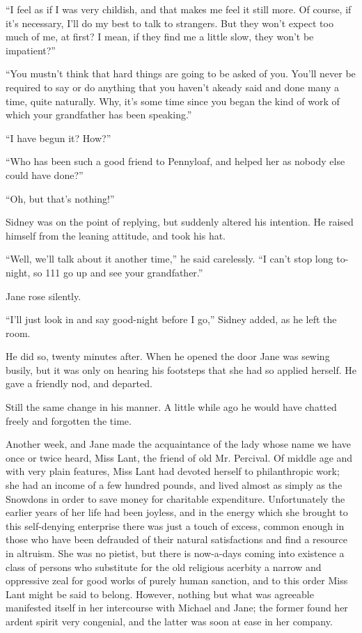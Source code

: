 ``I feel as if I was very childish, and that makes me feel it still
more. Of course, if it's necessary, I'll do my best to talk to
strangers. {}But they won't expect too much of me, at first? I mean, if
they find me a little slow, they won't be impatient?''

``You mustn't think that hard things are going to be asked of you.
You'll never be required to say or do anything that you haven't akeady
said and done many a time, quite naturally. Why, it's some time since
you began the kind of work of which your grandfather has been
speaking.''

``I have begun it? How?''

``Who has been such a good friend to Pennyloaf, and helped her as nobody
else could have done?''

``Oh, but that's nothing!''

Sidney was on the point of replying, but suddenly altered his intention.
He raised himself from the leaning attitude, and took his hat.

``Well, we'll talk about it another time,'' he said carelessly. ``I
can't stop long to-night, so 111 go up and see your grandfather.''

Jane rose silently.

``I'll just look in and say good-night before I go,'' Sidney added, as
he left the room.

{}He did so, twenty minutes after. When he opened the door Jane was
sewing busily, but it was only on hearing his footsteps that she had so
applied herself. He gave a friendly nod, and departed.

Still the same change in his manner. A little while ago he would have
chatted freely and forgotten the time.

Another week, and Jane made the acquaintance of the lady whose name we
have once or twice heard, Miss Lant, the friend of old Mr. Percival. Of
middle age and with very plain features, Miss Lant had devoted herself
to philanthropic work; she had an income of a few hundred pounds, and
lived almost as simply as the Snowdons in order to save money for
charitable expenditure. Unfortunately the earlier years of her life had
been joyless, and in the energy which she brought to this self-denying
enterprise there was just a touch of excess, common enough in those who
have been defrauded of their natural satisfactions and find a resource
in altruism. She was no pietist, but there is now-a-days {}coming into
existence a class of persons who substitute for the old religious
acerbity a narrow and oppressive zeal for good works of purely human
sanction, and to this order Miss Lant might be said to belong. However,
nothing but what was agreeable manifested itself in her intercourse with
Michael and Jane; the former found her ardent spirit very congenial, and
the latter was soon at ease in her company.

